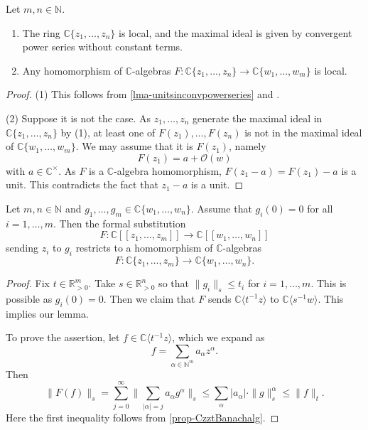 \begin{thm}\label{thm-converinglocal}
    Let $m, n\in \mathbb{N}$.
\begin{enumerate}
    \item The ring $\mathbb{C}\{ z_1,\ldots,z_n \}$ is local, and the maximal ideal is given by convergent power series without constant terms.
    \item Any homomorphism of $\mathbb{C}$-algebras $F:\mathbb{C}\{ z_1,\ldots,z_n \}\rightarrow \mathbb{C}\{ w_1,\ldots,w_m \}$ is local.
\end{enumerate}


\end{thm}
\begin{proof}
(1) This follows from \cref{lma-unitsinconvpowerseries} and \cite[\href{https://stacks.math.columbia.edu/tag/00E9}{Tag 00E9}]{stacks-project}.

(2) Suppose it is not the case. As $z_1,\ldots,z_n$ generate the maximal ideal in $\mathbb{C}\{ z_1,\ldots,z_n \}$ by (1), at least one of $F(z_1),\ldots,F(z_n)$ is not in the maximal ideal of  $\mathbb{C}\{ w_1,\ldots,w_m \}$. We may assume that it is $F(z_1)$, namely
\[
    F(z_1)=a+\mathcal{O}(w)  
\]
with $a\in \mathbb{C}^{\times}$. As $F$ is a $\mathbb{C}$-algebra homomorphism, $F(z_1-a)=F(z_1)-a$ is a unit. This contradicts the fact that $z_1-a$ is a unit.
\end{proof}




\begin{lemma}\label{lma-univerpropconvspecialcase}
    Let $m,n\in \mathbb{N}$ and $g_1,\ldots,g_m\in \mathbb{C}\{ w_1,\ldots,w_n\}$. Assume that $g_i(0)=0$ for all $i=1,\ldots,m$. 
    Then the formal substitution 
    \[
        F:\mathbb{C}[[z_1,\ldots,z_m]]\rightarrow \mathbb{C}[[w_1,\ldots,w_n]]
    \]
    sending $z_i$ to $g_i$ restricts to a homomorphism of $\mathbb{C}$-algebras
    \[
        F:  \mathbb{C}\{ z_1,\ldots,z_m\}\rightarrow  \mathbb{C}\{ w_1,\ldots,w_n\}.
    \]
\end{lemma}
\begin{proof}
    Fix $t\in \mathbb{R}^m_{>0}$. Take $s\in \mathbb{R}^n_{>0}$ so that $\|g_i\|_s\leq t_i$ for $i=1,\ldots,m$. This is possible as $g_i(0)=0$.
    Then we claim that $F$ sends $\mathbb{C}\langle t^{-1}z \rangle$ to $\mathbb{C}\langle s^{-1}w\rangle$. This implies our lemma.

    To prove the assertion, let $f\in \mathbb{C}\langle t^{-1}z\rangle$, which we expand as
    \[
        f=\sum_{\alpha\in \mathbb{N}^m} a_{\alpha}z^{\alpha}.
    \]
    Then
    \[
        \|F(f)\|_s=\sum_{j=0}^{\infty}\|\sum_{|\alpha|=j}a_{\alpha}g^{\alpha}\|_s\leq \sum_{\alpha}|a_{\alpha}|\cdot \|g\|_s^{\alpha}\leq \|f\|_t.
    \]
    Here the first inequality follows from \cref{prop-CzztBanachalg}.
\end{proof}

